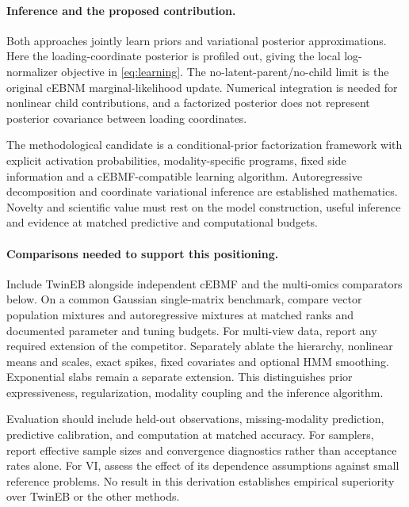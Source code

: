\paragraph{Inference and the proposed contribution.}
Both approaches jointly learn priors and variational posterior approximations.
Here the loading-coordinate posterior is profiled out, giving the local
log-normalizer objective in \eqref{eq:learning}. The no-latent-parent/no-child
limit is the original cEBNM marginal-likelihood update. Numerical integration
is needed for nonlinear child contributions, and a factorized posterior
does not represent posterior covariance between loading coordinates.

The methodological candidate is a conditional-prior factorization framework
with explicit activation probabilities, modality-specific programs, fixed
side information and a cEBMF-compatible learning algorithm. Autoregressive
decomposition and coordinate variational inference are established mathematics.
Novelty and scientific value must rest on the model construction, useful
inference and evidence at matched predictive and computational budgets.

\paragraph{Comparisons needed to support this positioning.}
Include TwinEB alongside independent cEBMF and the multi-omics
comparators below. On a common Gaussian single-matrix benchmark,
compare vector population mixtures and autoregressive mixtures at
matched ranks and documented parameter and tuning budgets. For
multi-view data, report any required extension of the competitor.
Separately ablate the hierarchy, nonlinear means and scales, exact
spikes, fixed covariates and optional HMM smoothing. Exponential slabs remain a separate extension.
This distinguishes prior expressiveness, regularization, modality
coupling and the inference algorithm.

Evaluation should include held-out observations, missing-modality
prediction, predictive calibration, and computation at matched
accuracy. For samplers, report effective sample sizes and convergence
diagnostics rather than acceptance rates alone. For VI, assess the
effect of its dependence assumptions against small reference problems.
No result in this derivation establishes empirical superiority over
TwinEB or the other methods.
